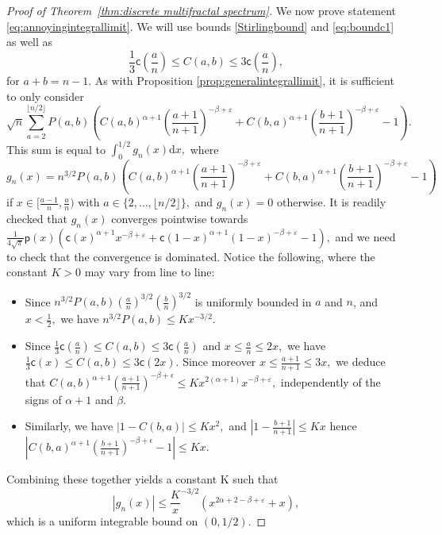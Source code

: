 \documentclass[11pt]{article}
\newcommand{\pp}{\mathsf{p}}
\newcommand{\cc}{\mathsf{c}}
\newcommand{\ff}{\cc}
\newcommand{\veps}{\varepsilon}
\renewcommand{\leq}{\leqslant}
\begin{document}
\begin{proof}[Proof of Theorem~\ref{thm:discrete multifractal spectrum}]
\vspace{0.5cm}
We now prove statement \eqref{eq:annoyingintegrallimit}. We will use bounds \eqref{Stirlingbound} and \eqref{eq:boundc1} as well as
\[\frac1{3} \cc{\left(\frac{a}{n}\right)}\leq C(a,b)\leq 3 \cc{\left(\frac{a}{n}\right)},\]
for $a+b=n-1.$ As with Proposition \ref{prop:generalintegrallimit}, it is sufficient to only consider
\[\sqrt{n}\sum_{a=2}^{\lfloor n/2 \rfloor}P(a,b)\left(C(a,b)^{\alpha+1}\left(\frac{a+1}{n+1}\right)^{-\beta+\veps}+C(b,a)^{\alpha+1}\left(\frac{b+1}{n+1}\right)^{-\beta+\veps}-1\right).\]
This sum is equal to $\int_0^{1/2} g_n(x)\mathrm{d}x,$ where 
\[g_n(x)= n^{3/2}P(a,b)\left(C(a,b)^{\alpha+1}\left(\frac{a+1}{n+1}\right)^{-\beta+\veps}+C(b,a)^{\alpha+1}\left(\frac{b+1}{n+1}\right)^{-\beta+\veps}-1\right)\] if $x\in[\frac{a-1}{n},\frac{a}{n})$ with $a\in \{2,\ldots,\lfloor n/2 \rfloor\},$ and $g_n(x)=0$ otherwise. It is readily checked that $g_n(x)$ converges pointwise towards $\frac{1}{4\sqrt{\pi}} \pp(x)\left(\ff(x)^{\alpha+1} x^{-\beta+\veps}+\ff(1-x)^{\alpha+1} (1-x)^{-\beta+\veps}-1\right),$
and we need to check that the convergence is dominated. Notice the following, where the constant $K>0$ may vary from line to line:
\begin{itemize}
    \item Since $n^{3/2} P(a,b)\left(\frac{a}{n}\right)^{3/2}\left(\frac{b}{n}\right)^{3/2}$ is uniformly bounded in $a$ and $n$, and $x<\frac{1}{2},$ we have $n^{3/2}P(a,b)\leq K x^{-3/2}.$
    \item Since $\frac1{3}\ff(\frac{a}{n})\leq C(a,b)\leq 3\ff(\frac{a}{n})$ and $x\leq \frac{a}{n}\leq 2x,$ we have $\frac1{3}\ff(x)\leq C(a,b)\leq 3\ff(2x).$ Since moreover $x\leq\frac{a+1}{n+1}\leq 3x,$ we deduce that $C(a,b)^{\alpha+1} \left(\frac{a+1}{n+1}\right)^{-\beta+\epsilon}\leq K x^{2(\alpha+1)}x^{-\beta+\veps},$ independently of the signs of $\alpha+1$ and $\beta.$
    \item Similarly, we have $|1-C(b,a)|\leq Kx^2,$ and $\left|1-\frac{b+1}{n+1}\right|\leq Kx$ hence $\left|C(b,a)^{\alpha+1}\left(\frac{b+1}{n+1}\right)^{-\beta+\epsilon}-1\right| \leq K x.$
\end{itemize}

 Combining these together yields a constant K such that
 \[|g_n(x)|\leq \frac{K}x^{-3/2}\left(x^{2\alpha+2-\beta+\veps}+x\right),\]
 which is a uniform integrable bound on $(0,1/2).$
\end{proof}
\end{document}
